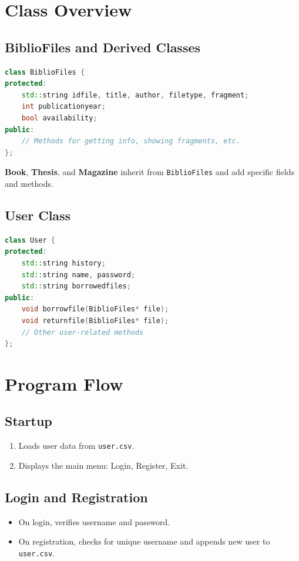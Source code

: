 \documentclass[a4paper,12pt]{article}
\begin{document}
\section{Class Overview}

\subsection{BiblioFiles and Derived Classes}
\begin{lstlisting}[language=C++, caption={BiblioFiles Base Class}]
class BiblioFiles {
protected:
    std::string idfile, title, author, filetype, fragment;
    int publicationyear;
    bool availability;
public:
    // Methods for getting info, showing fragments, etc.
};
\end{lstlisting}

\textbf{Book}, \textbf{Thesis}, and \textbf{Magazine} inherit from \texttt{BiblioFiles} and add specific fields and methods.

\subsection{User Class}
\begin{lstlisting}[language=C++, caption={User Class}]
class User {
protected:
    std::string history;
    std::string name, password;
    std::string borrowedfiles;
public:
    void borrowfile(BiblioFiles* file);
    void returnfile(BiblioFiles* file);
    // Other user-related methods
};
\end{lstlisting}

\section{Program Flow}

\subsection{Startup}
\begin{enumerate}
    \item Loads user data from \texttt{user.csv}.
    \item Displays the main menu: Login, Register, Exit.
\end{enumerate}

\subsection{Login and Registration}
\begin{itemize}
    \item On login, verifies username and password.
    \item On registration, checks for unique username and appends new user to \texttt{user.csv}.
\end{itemize}
\end{document}
